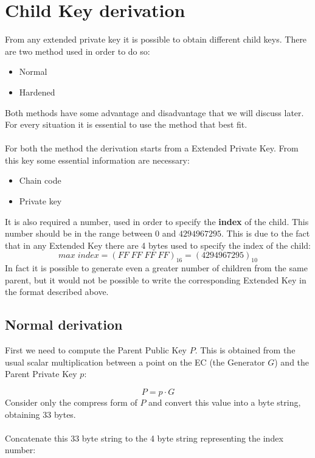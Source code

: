 \section{Child Key derivation}
From any extended private key it is possible to obtain different child keys. There are two method used in order to do so:
\begin{itemize}
	\item Normal
	\item Hardened
\end{itemize}
Both methods have some advantage and disadvantage that we will discuss later. For every situation it is essential to use the method that best fit.
\\ \\
For both the method the derivation starts from a Extended Private Key. From this key some essential information are necessary:
\begin{itemize}[label=$\star$]
	\item Chain code
	\item Private key
\end{itemize}
It is also required a number, used in order to specify the \textbf{index} of the child. This number should be in the range between $0$ and $4294967295$. This is due to the fact that in any Extended Key there are 4 bytes used to specify the index of the child:
\begin{equation*}
max \; index=(FF\;FF\;FF\;FF)_{16} = (4294967295)_{10}
\end{equation*}
In fact it is possible to generate even a greater number of children from the same parent, but it would not be possible to write the corresponding Extended Key in the format described above.


\subsection{Normal derivation}

First we need to compute the Parent Public Key $P$. This is obtained from the usual scalar multiplication between a point on the EC (the Generator $G$) and the Parent Private Key $p$:

\begin{equation*}
P=p\cdot G
\end{equation*}
Consider only the compress form of $P$ and convert this value into a byte string, obtaining 33 bytes.
\\ \\
Concatenate this 33 byte string to the 4 byte string representing the index number:

